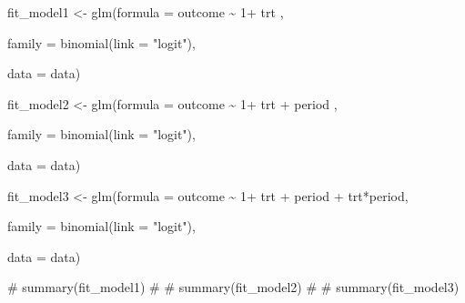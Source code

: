 \documentclass[
  letterpaper,
  DIV=11,
  numbers=noendperiod]{scrreprt}
\newenvironment{Shaded}{\begin{snugshade}}{\end{snugshade}}
\newcommand{\AttributeTok}[1]{\textcolor[rgb]{0.40,0.45,0.13}{#1}}
\newcommand{\CommentTok}[1]{\textcolor[rgb]{0.37,0.37,0.37}{#1}}
\newcommand{\DecValTok}[1]{\textcolor[rgb]{0.68,0.00,0.00}{#1}}
\newcommand{\FunctionTok}[1]{\textcolor[rgb]{0.28,0.35,0.67}{#1}}
\newcommand{\NormalTok}[1]{\textcolor[rgb]{0.00,0.23,0.31}{#1}}
\newcommand{\OtherTok}[1]{\textcolor[rgb]{0.00,0.23,0.31}{#1}}
\newcommand{\SpecialCharTok}[1]{\textcolor[rgb]{0.37,0.37,0.37}{#1}}
\newcommand{\StringTok}[1]{\textcolor[rgb]{0.13,0.47,0.30}{#1}}
\begin{document}
\begin{Shaded}
\begin{Highlighting}[]
\NormalTok{fit\_model1 }\OtherTok{\textless{}{-}} \FunctionTok{glm}\NormalTok{(}\AttributeTok{formula =}\NormalTok{ outcome }\SpecialCharTok{\textasciitilde{}} \DecValTok{1}\SpecialCharTok{+}\NormalTok{ trt ,}

    \AttributeTok{family =} \FunctionTok{binomial}\NormalTok{(}\AttributeTok{link =} \StringTok{"logit"}\NormalTok{),}

    \AttributeTok{data =}\NormalTok{ data)}

\NormalTok{fit\_model2 }\OtherTok{\textless{}{-}} \FunctionTok{glm}\NormalTok{(}\AttributeTok{formula =}\NormalTok{ outcome }\SpecialCharTok{\textasciitilde{}} \DecValTok{1}\SpecialCharTok{+}\NormalTok{ trt }\SpecialCharTok{+}\NormalTok{ period ,}

    \AttributeTok{family =} \FunctionTok{binomial}\NormalTok{(}\AttributeTok{link =} \StringTok{"logit"}\NormalTok{),}

    \AttributeTok{data =}\NormalTok{ data)}

\NormalTok{fit\_model3 }\OtherTok{\textless{}{-}} \FunctionTok{glm}\NormalTok{(}\AttributeTok{formula =}\NormalTok{ outcome }\SpecialCharTok{\textasciitilde{}} \DecValTok{1}\SpecialCharTok{+}\NormalTok{ trt }\SpecialCharTok{+}\NormalTok{ period }\SpecialCharTok{+}\NormalTok{ trt}\SpecialCharTok{*}\NormalTok{period,}

    \AttributeTok{family =} \FunctionTok{binomial}\NormalTok{(}\AttributeTok{link =} \StringTok{"logit"}\NormalTok{),}

    \AttributeTok{data =}\NormalTok{ data)}

\CommentTok{\# summary(fit\_model1)}
\CommentTok{\# }
\CommentTok{\# summary(fit\_model2)}
\CommentTok{\# }
\CommentTok{\# summary(fit\_model3)}
\end{Highlighting}
\end{Shaded}
\end{document}
